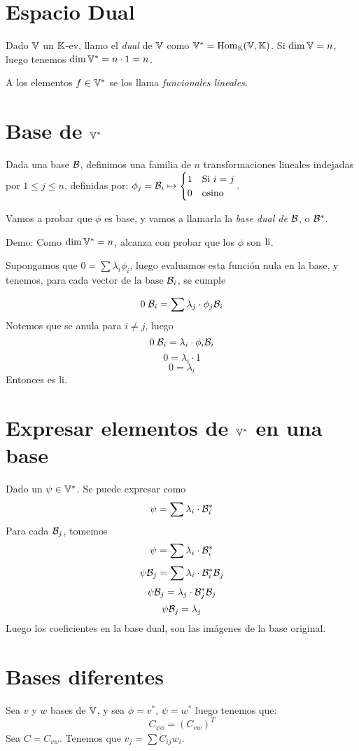 \documentclass{article}
\begin{document}
	\section*{Espacio Dual}
	Dado $\mathbb{V}$ un $\mathbb{K}$-ev, llamo el \emph{dual} de $\mathbb{V}$ como $\mathbb{V}^* =
	\operatorname{Hom}_{\mathbb{K}}(\mathbb{V},\mathbb{K})$.
	Si $\dim \mathbb{V} = n$, luego tenemos $\dim \mathbb{V}^* = n \cdot 1 = n$.

	A los elementos $f \in \mathbb{V}^*$ se los llama \emph{funcionales lineales}.

	\section*{Base de $\mathbb{V}^*$}
	Dada una base $\mathcal{B}$, definimos una familia de $n$ transformaciones
	lineales indejadas por $1 \leq j \leq n$, definidas por:
	$\phi_j = \mathcal{B}_i \mapsto
	\begin{cases}
		1 & \text{Si $i = j$} \\
		0 & \text{osino}
	\end{cases}
	$. 

	Vamos a probar que $\phi$ es base, y vamos a llamarla la \emph{base dual
	de $\mathcal{B}$}, o $\mathcal{B}^*$.

	Demo: Como $\dim \mathbb{V}^* = n$, alcanza con probar que los $\phi$ son $\operatorname{li}$.

	Supongamos que $0 = \sum \lambda_i\phi_i$, luego evaluamos esta función nula
	en la base, y tenemos, para cada vector de la base $\mathcal{B}_i$, se cumple

	\[
		0\;\mathcal{B}_i = \sum \lambda_j \cdot \phi_j \mathcal{B}_i
	\]
	Notemos que se anula para $i \neq j$, luego 
	\[
		0\;\mathcal{B}_i = \lambda_i \cdot \phi_i \mathcal{B}_i
	\]
	\[
		0 = \lambda_i \cdot 1
	\]
	\[
		0 = \lambda_i
	\]
	Entonces es li.

	\section*{Expresar elementos de $\mathbb{V}^*$ en una base}
	Dado un $\psi \in \mathbb{V}^*$. Se puede expresar como
	\[
		\psi = \sum \lambda_i \cdot \mathcal{B}^*_i
	\]
	Para cada $\mathcal{B}_j$, tomemos
	\[
		\psi = \sum \lambda_i \cdot \mathcal{B}^*_i
	\]
	\[
		\psi\mathcal{B}_j = \sum \lambda_i \cdot \mathcal{B}^*_i \mathcal{B}_j
	\]
	\[
		\psi\mathcal{B}_j = \lambda_j \cdot \mathcal{B}^*_j \mathcal{B}_j
	\]
	\[
		\psi\mathcal{B}_j = \lambda_j
	\]
	Luego los coeficientes en la base dual, son las imágenes de la base
	original.

	\section*{Bases diferentes}
	Sea $v$ y $w$ bases de $\mathbb{V}$, y sea $\phi = v^*$, $\psi = w^*$
	luego tenemos que:
	\[
		C_{\psi\phi} = (C_{vw})^T
	\]
	Sea $C = C_{vw}$. Tenemos que $v_j = \sum C_{ij}w_i$.
\end{document}
